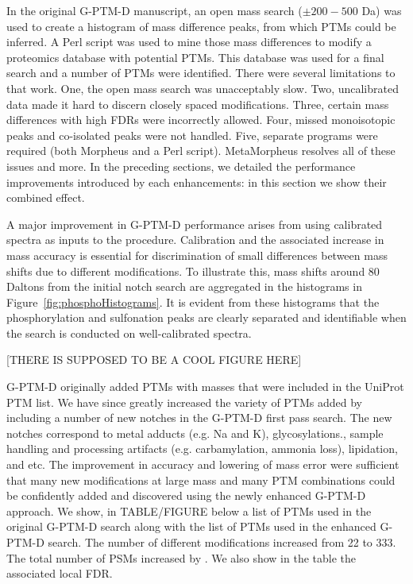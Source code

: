 \documentclass[journal=jprobs,manuscript=article]{achemso}
\begin{document}
In the original G-PTM-D manuscript, an open mass search ($\pm 200-500$ Da) was used to create a histogram of mass difference peaks, from which PTMs could be inferred.
A Perl script was used to mine those mass differences to modify a proteomics database with potential PTMs.
This database was used for a final search and a number of PTMs were identified.
There were several limitations to that work.
One, the open mass search was unacceptably slow.
Two, uncalibrated data made it hard to discern closely spaced modifications.
Three, certain mass differences with high FDRs were incorrectly allowed.
Four, missed monoisotopic peaks and co-isolated peaks were not handled.
Five, separate programs were required (both Morpheus and a Perl script).
MetaMorpheus resolves all of these issues and more.
In the preceding sections, we detailed the performance improvements introduced by each enhancements: in this section we show their combined effect.

A major improvement in G-PTM-D performance arises from using calibrated spectra as inputs to the procedure.
Calibration and the associated increase in mass accuracy is essential for discrimination of small differences between mass shifts due to different modifications.
To illustrate this, mass shifts around 80 Daltons from the initial notch search are aggregated in the histograms in Figure~\ref{fig:phosphoHistograms}.
It is evident from these histograms that the phosphorylation and sulfonation peaks are clearly separated and identifiable when the search is conducted on well-calibrated spectra.

[THERE IS SUPPOSED TO BE A COOL FIGURE HERE]

G-PTM-D originally added PTMs with masses that were included in the UniProt PTM list.
We have since greatly increased the variety of PTMs added by including a number of new notches in the G-PTM-D first pass search.
The new notches correspond to metal adducts (e.g. Na and K), glycosylations., sample handling and processing artifacts (e.g. carbamylation, ammonia loss), lipidation, and etc.
The improvement in accuracy and lowering of mass error were sufficient that many new modifications at large mass and many PTM combinations could be confidently added and discovered using the newly enhanced G-PTM-D approach.
We show, in TABLE/FIGURE below a list of PTMs used in the original G-PTM-D search along with the list of PTMs used in the enhanced G-PTM-D search.
The number of different modifications increased from 22 to 333.
The total number of PSMs increased by . We also show in the table the associated local FDR.
\end{document}
